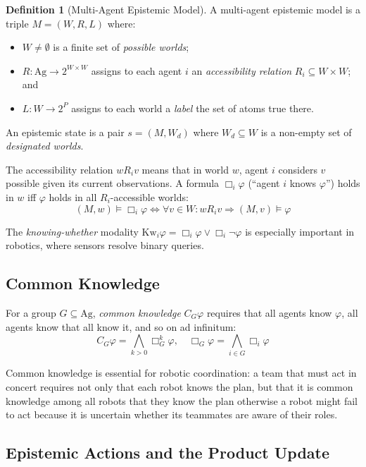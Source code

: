 \documentclass[12pt,a4paper]{article}
\theoremstyle{definition}
\newtheorem{definition}{Definition}[section]
\theoremstyle{plain}
\begin{document}
\begin{definition}[Multi-Agent Epistemic Model]
A multi-agent epistemic model is a triple $M = (W, R, L)$ where:
\begin{itemize}[noitemsep]
\item $W \neq \emptyset$ is a finite set of \textit{possible worlds};
\item $R : \mathrm{Ag} \to 2^{W \times W}$ assigns to each agent $i$ an
      \textit{accessibility relation} $R_i \subseteq W \times W$; and
\item $L : W \to 2^P$ assigns to each world a \textit{label} the set of atoms true there.
\end{itemize}
An epistemic state is a pair $s = (M, W_d)$ where $W_d \subseteq W$ is a non-empty set of
\textit{designated worlds}.
\end{definition}

The accessibility relation $w R_i v$ means that in world $w$, agent $i$ considers $v$ possible
given its current observations. A formula $\Box_i \varphi$ (``agent $i$ knows $\varphi$'') holds
in $w$ iff $\varphi$ holds in all $R_i$-accessible worlds:
\[
(M, w) \models \Box_i \varphi \iff \forall v \in W: w R_i v \Rightarrow (M, v) \models \varphi
\]

The \textit{knowing-whether} modality $\mathrm{Kw}_i \varphi = \Box_i \varphi \vee \Box_i
\neg\varphi$ is especially important in robotics, where sensors resolve binary queries.

\subsection{Common Knowledge}

For a group $G \subseteq \mathrm{Ag}$, \textit{common knowledge} $C_G \varphi$ requires that all
agents know $\varphi$, all agents know that all know it, and so on ad infinitum:
\[
C_G \varphi = \bigwedge_{k > 0} \Box_G^k \varphi,
\quad \Box_G \varphi = \bigwedge_{i \in G} \Box_i \varphi
\]

Common knowledge is essential for robotic coordination: a team that must act in concert requires
not only that each robot knows the plan, but that it is common knowledge among all robots that
they know the plan otherwise a robot might fail to act because it is uncertain whether its
teammates are aware of their roles.

\subsection{Epistemic Actions and the Product Update}
\end{document}
